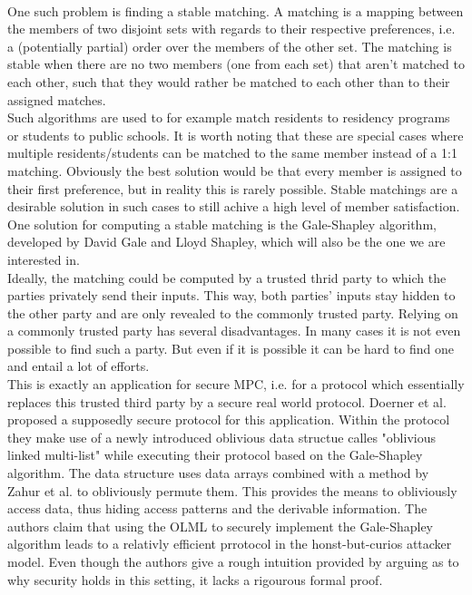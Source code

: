 \ \\One such problem is finding a stable matching. A matching is a mapping between the members of two disjoint sets with regards to their respective preferences, i.e. a (potentially partial) order over the members of the other set. The matching is stable when there are no two members (one from each set) that aren't matched to each other, such that they would rather be matched to each other than to their assigned matches.\\ 
Such algorithms are used to for example match residents to residency programs or students to public schools. It is worth noting that these are special cases where multiple  residents/students can be matched to the same member instead of a 1:1 matching. Obviously the best solution would be that every member is assigned to their first preference, but in reality this is rarely possible. Stable matchings are a desirable solution in such cases to still achive a high level of member satisfaction.\\
One solution for computing a stable matching is the Gale-Shapley algorithm, developed by David Gale and Lloyd Shapley, which will also be the one we are interested in.\\ 
Ideally, the matching could be computed by a trusted thrid party to which the parties privately send their inputs. This way, both parties' inputs stay hidden to the other party and are only revealed to the commonly trusted party.
Relying on a commonly trusted party has several disadvantages. In many cases it is not even possible to find such a party. But even if it is possible it can be hard to find one and entail a lot of efforts. \\
This is exactly an application for secure MPC, i.e. for a protocol which essentially replaces this trusted third party by a secure real world protocol. Doerner et al. proposed a supposedly secure protocol for this application. Within the protocol they make use of a newly introduced oblivious data structue calles "oblivious linked multi-list" while executing their protocol based on the Gale-Shapley algorithm. The data structure uses data arrays combined with a method by Zahur et al.  to obliviously permute them. This provides the means to obliviously access data, thus hiding access patterns and the derivable information. The authors claim that using the OLML to securely implement the Gale-Shapley algorithm leads to a relativly efficient prrotocol in the honst-but-curios attacker model. Even though the authors give a rough intuition provided by arguing as to why security holds in this setting, it lacks a rigourous formal proof.\\ \citet{sok}\\
\citet{smas}\\
\citeauthor{smas}
\citep{htsi}